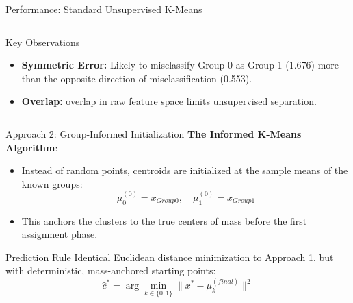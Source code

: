 \documentclass[8pt, aspectratio=169]{beamer}
\begin{document}
\begin{frame}{Performance: Standard Unsupervised K-Means}
\begin{columns}
        \vspace{0.4cm}

        \begin{alertblock}{Key Observations}
            \tiny
            \begin{itemize}
      
                \item \textbf{Symmetric Error:} Likely to misclassify Group 0 as Group 1 (1.676) more than the opposite direction of misclassification (0.553).
                \item \textbf{Overlap:} overlap in raw feature space limits unsupervised separation.
            \end{itemize}
        \end{alertblock}
    \end{columns}
\end{frame}

\begin{frame}{Approach 2: Group-Informed Initialization}
    \textbf{The Informed K-Means Algorithm}:
    \begin{itemize}
        \item Instead of random points, centroids are initialized at the sample means of the known groups:
        \[ \mu_0^{(0)} = \bar{x}_{Group 0}, \quad \mu_1^{(0)} = \bar{x}_{Group 1} \]
        \item This anchors the clusters to the true centers of mass before the first assignment phase.
    \end{itemize}
    \begin{exampleblock}{Prediction Rule}
        Identical Euclidean distance minimization to Approach 1, but with deterministic, mass-anchored starting points:
    \[ \hat{c}^* = \arg \min_{k \in \{0,1\}} \|x^* - \mu_k^{(final)}\|^2 \]
    \end{exampleblock}
    
\end{frame}
\end{document}
